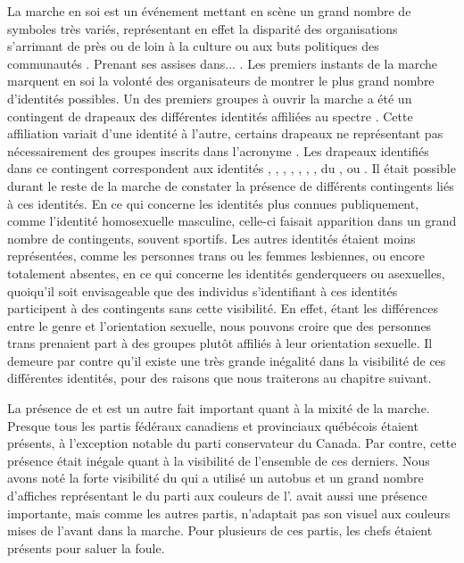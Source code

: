 La marche en soi est un événement mettant en scène un grand nombre de symboles très variés, représentant en effet la disparité des organisations s'arrimant de près ou de loin à la culture ou aux buts politiques des communautés \lgbt.
Prenant ses assises dans... .
Les premiers instants de la marche marquent en soi la volonté des organisateurs de montrer le plus grand nombre d'identités possibles.
Un des premiers groupes à ouvrir la marche a été un contingent de drapeaux des différentes identités affiliées au spectre \lgbt{}.
Cette affiliation variait d'une identité à l'autre, certains drapeaux ne représentant pas nécessairement des groupes inscrits dans l'acronyme \lgbt.
Les drapeaux identifiés dans ce contingent correspondent aux identités , , , , , , , du , ou .
Il était possible durant le reste de la marche de constater la présence de différents contingents liés à ces identités.
En ce qui concerne les identités plus connues publiquement, comme l'identité homosexuelle masculine, celle-ci faisait apparition dans un grand nombre de contingents, souvent sportifs.
Les autres identités étaient moins représentées, comme les personnes trans ou les femmes lesbiennes, ou encore totalement absentes, en ce qui concerne les identités genderqueers ou asexuelles, quoiqu'il soit envisageable que des individus s'identifiant à ces identités participent à des contingents sans cette visibilité.
En effet, étant les différences entre le genre et l'orientation sexuelle, nous pouvons croire que des personnes trans prenaient part à des groupes plutôt affiliés à leur orientation sexuelle.
Il demeure par contre qu'il existe une très grande inégalité dans la visibilité de ces différentes identités, pour des raisons que nous traiterons au chapitre suivant.

La présence de  et  est un autre fait important quant à la mixité de la marche.
Presque tous les partis fédéraux canadiens et provinciaux québécois étaient présents, à l'exception notable du parti conservateur du Canada.
Par contre, cette présence était inégale quant à la visibilité de l'ensemble de ces derniers.
Nous avons noté la forte visibilité du  qui a utilisé un autobus et un grand nombre d'affiches représentant le  du parti aux couleurs de l'.
 avait aussi une présence importante, mais comme les autres partis, n'adaptait pas son visuel aux couleurs mises de l'avant dans la marche.
Pour plusieurs de ces partis, les chefs étaient présents pour saluer la foule.

